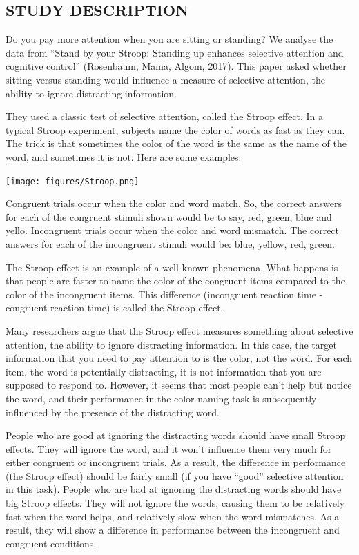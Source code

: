 \documentclass[
]{book}
\begin{document}
\hypertarget{study-description-4}{%
\subsection{STUDY DESCRIPTION}\label{study-description-4}}

Do you pay more attention when you are sitting or standing? We analyse the data from ``Stand by your Stroop: Standing up enhances selective attention and cognitive control'' (Rosenbaum, Mama, Algom, 2017). This paper asked whether sitting versus standing would influence a measure of selective attention, the ability to ignore distracting information.

They used a classic test of selective attention, called the Stroop effect. In a typical Stroop experiment, subjects name the color of words as fast as they can. The trick is that sometimes the color of the word is the same as the name of the word, and sometimes it is not. Here are some examples:

\texttt{[image: figures/Stroop.png]}

Congruent trials occur when the color and word match. So, the correct answers for each of the congruent stimuli shown would be to say, red, green, blue and yello. Incongruent trials occur when the color and word mismatch. The correct answers for each of the incongruent stimuli would be: blue, yellow, red, green.

The Stroop effect is an example of a well-known phenomena. What happens is that people are faster to name the color of the congruent items compared to the color of the incongruent items. This difference (incongruent reaction time - congruent reaction time) is called the Stroop effect.

Many researchers argue that the Stroop effect measures something about selective attention, the ability to ignore distracting information. In this case, the target information that you need to pay attention to is the color, not the word. For each item, the word is potentially distracting, it is not information that you are supposed to respond to. However, it seems that most people can't help but notice the word, and their performance in the color-naming task is subsequently influenced by the presence of the distracting word.

People who are good at ignoring the distracting words should have small Stroop effects. They will ignore the word, and it won't influence them very much for either congruent or incongruent trials. As a result, the difference in performance (the Stroop effect) should be fairly small (if you have ``good'' selective attention in this task). People who are bad at ignoring the distracting words should have big Stroop effects. They will not ignore the words, causing them to be relatively fast when the word helps, and relatively slow when the word mismatches. As a result, they will show a difference in performance between the incongruent and congruent conditions.
\end{document}

